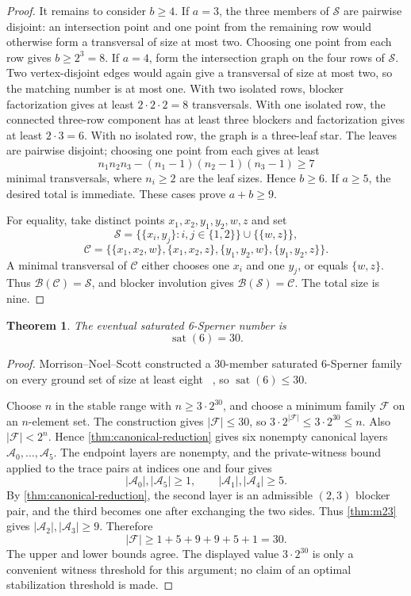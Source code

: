 \documentclass[a4paper,fleqn,longmktitle]{cas-sc}
\newtheorem{theorem}{Theorem}[section]
\theoremstyle{definition}
\theoremstyle{remark}
\newcommand{\family}{\mathcal{F}}
\newcommand{\sat}{\operatorname{sat}}
\newcommand{\blocker}{\mathcal{B}}
\begin{document}
\begin{proof}
It remains to consider $b\geq4$.  If $a=3$, the three members of
$\mathcal S$ are pairwise disjoint: an intersection point and one point from
the remaining row would otherwise form a transversal of size at most two.
Choosing one point from each row gives $b\geq2^3=8$.  If $a=4$, form the
intersection graph on the four rows of $\mathcal S$.  Two vertex-disjoint
edges would again give a transversal of size at most two, so the matching
number is at most one.  With two isolated rows, blocker factorization gives at
least $2\cdot2\cdot2=8$ transversals.  With one isolated row, the connected
three-row component has at least three blockers and factorization gives at
least $2\cdot3=6$.  With no isolated row, the graph is a three-leaf star.
The leaves are pairwise disjoint; choosing one point from each gives at least
\[
  n_1n_2n_3-(n_1-1)(n_2-1)(n_3-1)\geq7
\]
minimal transversals, where $n_i\geq2$ are the leaf sizes.  Hence $b\geq6$.
If $a\geq5$, the desired total is immediate.  These cases prove
$a+b\geq9$.

For equality, take distinct points $x_1,x_2,y_1,y_2,w,z$ and set
\[
  \mathcal S=\{\{x_i,y_j\}:i,j\in\{1,2\}\}\cup\{\{w,z\}\},
\]
\[
  \mathcal C=\{\{x_1,x_2,w\},\{x_1,x_2,z\},
  \{y_1,y_2,w\},\{y_1,y_2,z\}\}.
\]
A minimal transversal of $\mathcal C$ either chooses one $x_i$ and one
$y_j$, or equals $\{w,z\}$.  Thus
$\blocker(\mathcal C)=\mathcal S$, and blocker involution gives
$\blocker(\mathcal S)=\mathcal C$.  The total size is nine.
\end{proof}

\begin{theorem}
\label{thm:sat6}
The eventual saturated 6-Sperner number is
\[
  \sat(6)=30.
\]
\end{theorem}

\begin{proof}
Morrison--Noel--Scott constructed a 30-member saturated 6-Sperner family on
every ground set of size at least eight~
\cite[Proposition~20]{mns2014}, so $\sat(6)\leq30$.

Choose $n$ in the stable range with $n\geq3\cdot2^{30}$, and choose a minimum
family $\family$ on an $n$-element set.  The construction gives
$|\family|\leq30$, so
$3\cdot2^{|\family|}\leq3\cdot2^{30}\leq n$.  Also
$|\family|<2^n$.  Hence \cref{thm:canonical-reduction} gives six nonempty
canonical layers $\mathcal A_0,\ldots,\mathcal A_5$.  The endpoint layers
are nonempty, and the private-witness bound applied to the trace pairs at
indices one and four gives
\[
  |\mathcal A_0|,|\mathcal A_5|\geq1,\qquad
  |\mathcal A_1|,|\mathcal A_4|\geq5.
\]
By \cref{thm:canonical-reduction}, the second layer is an admissible
$(2,3)$ blocker pair, and the third becomes one after exchanging the two
sides.  Thus \cref{thm:m23} gives
$|\mathcal A_2|,|\mathcal A_3|\geq9$.  Therefore
\[
  |\family|\geq1+5+9+9+5+1=30.
\]
The upper and lower bounds agree.
The displayed value $3\cdot2^{30}$ is only a convenient witness threshold
for this argument; no claim of an optimal stabilization threshold is made.
\end{proof}
\end{document}
